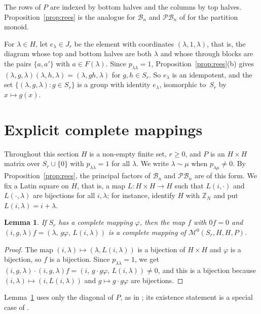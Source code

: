 \documentclass[11pt]{article}
\newtheorem{lemma}[theorem]{Lemma}
\theoremstyle{remark}
\newcommand{\B}{\mathcal B}
\newcommand{\PB}{\mathcal{PB}}
\newcommand{\M}{\mathcal M}
\newcommand{\Z}{\mathbb Z}
\begin{document}
The rows of $P$ are indexed by bottom halves and the columns by top halves.
Proposition~\ref{prop:rees} is the analogue for $\B_n$ and $\PB_n$ of
\cite[Proposition~8.3]{abchk} for the partition monoid.

For $\lambda\in H$, let $e_\lambda\in J_r$ be the element with coordinates
$(\lambda,1,\lambda)$, that is, the diagram whose top and bottom halves are
both $\lambda$ and whose through blocks are the pairs $\{a,a'\}$ with $a\in
F(\lambda)$. Since $p_{\lambda\lambda}=1$, Proposition~\ref{prop:rees}(b) gives
$(\lambda,g,\lambda)(\lambda,h,\lambda)=(\lambda,gh,\lambda)$ for $g,h\in
S_r$. So $e_\lambda$ is an idempotent, and the set
$\{(\lambda,g,\lambda):g\in S_r\}$ is a group with identity $e_\lambda$,
isomorphic to~$S_r$ by $x\mapsto g(x)$.

\section{Explicit complete mappings}\label{sec:cm}
Throughout this section $H$ is a non-empty finite set, $r\ge0$, and $P$ is an
$H\times H$ matrix over $S_r\cup\{0\}$ with $p_{\lambda\lambda}=1$ for all
$\lambda$. We write $\lambda\sim\mu$ when $p_{\lambda\mu}\ne0$. By
Proposition~\ref{prop:rees}, the principal factors of $\B_n$ and $\PB_n$ are
of this form. We fix a Latin square on $H$, that is, a map $L\colon H\times
H\to H$ such that $L(i,\cdot)$ and $L(\cdot,\lambda)$ are bijections for all
$i,\lambda$; for instance, identify $H$ with $\Z_N$ and put
$L(i,\lambda)=i+\lambda$.

\begin{lemma}\label{lem:A}
If $S_r$ has a complete mapping $\varphi$, then the map $f$ with $0f=0$ and
$(i,g,\lambda)f=(\lambda,\,g\varphi,\,L(i,\lambda))$ is a complete mapping of
$\M^0(S_r,H,H,P)$.
\end{lemma}

\begin{proof}
The map $(i,\lambda)\mapsto(\lambda,L(i,\lambda))$ is a bijection of $H\times
H$ and $\varphi$ is a bijection, so $f$ is a bijection. Since
$p_{\lambda\lambda}=1$, we get $(i,g,\lambda)\cdot(i,g,\lambda)f=(i,\,g\cdot
g\varphi,\,L(i,\lambda))\ne0$, and this is a bijection because
$(i,\lambda)\mapsto(i,L(i,\lambda))$ and $g\mapsto g\cdot g\varphi$ are
bijections.
\end{proof}

Lemma~\ref{lem:A} uses only the diagonal of $P$, as in
\cite[Proposition~6.5]{abchk}; its existence statement is a special case of
\cite[Theorem~6.2]{abchk}.
\end{document}
